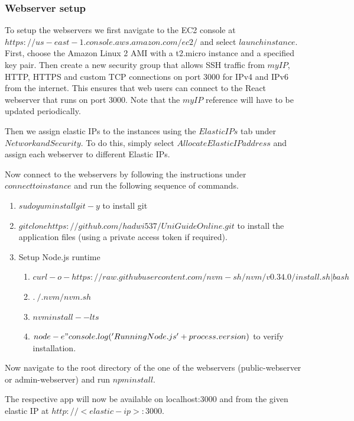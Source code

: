 \documentclass[12pt]{article}
\begin{document}
\subsubsection{Webserver setup}

To setup the webservers we first navigate to the EC2 console at $https://us-east-1.console.aws.amazon.com/ec2/$ and select $launch instance$. First, choose the Amazon Linux 2 AMI with a t2.micro instance and a specified key pair. Then create a new security group that allows SSH traffic from $myIP$, HTTP, HTTPS and custom TCP connections on port 3000 for IPv4 and IPv6 from the internet. This ensures that web users can connect to the React webserver that runs on port 3000. Note that the $myIP$ reference will have to be updated periodically. 

Then we assign elastic IPs to the instances using the $Elastic IPs$ tab under $Network and Security$. To do this, simply select $Allocate Elastic IP address$ and assign each webserver to different Elastic IPs.

Now connect to the webservers by following the instructions under $connect to instance$ and run the following sequence of commands. 

\begin{enumerate}
    \item $sudo yum install git -y$ to install git
    \item $git clone https://github.com/hadwi537/UniGuideOnline.git$ to install the application files (using a private access token if required).
    \item Setup Node.js runtime
    \begin{enumerate}
        \item $curl -o- https://raw.githubusercontent.com/nvm-sh/nvm/v0.34.0/install.sh | bash$
        \item $. ~/.nvm/nvm.sh$
        \item $nvm install --lts$
        \item $node -e "console.log('Running Node.js ' + process.version)$ to verify installation.
    \end{enumerate}
\end{enumerate}

Now navigate to the root directory of the one of the webservers (public-webserver or admin-webserver) and run $npm install$.

The respective app will now be available on localhost:3000 and from the given elastic IP at $http://<elastic-ip>:3000$.
\end{document}
